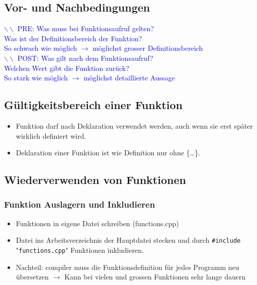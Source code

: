\documentclass[a3paper, 10pt, landscape]{scrartcl}
\newcommand{\code}[1]{\texttt{#1}}
\begin{document}
\begin{multicols*}{3}
	\subsection{Vor- und Nachbedingungen}
	\vspace{0.1cm}
	\textcolor{blue}{$\backslash \backslash$ PRE: Was muss bei Funktionsaufruf gelten? \\
	\phantom{// PRE: }Was ist der Definitionsbereich der Funktion? \\
	\phantom{// PRE: }So schwach wie möglich $\rightarrow$ möglichst grosser Definitionsbereich}\\
	\textcolor{blue}{$\backslash \backslash$ POST: Was gilt nach dem Funktionsaufruf? \\
	\phantom{// POST: }Welchen Wert gibt die Funktion zurück? \\
	\phantom{// POST: }So stark wie möglich $\rightarrow$ möglichst detaillierte Aussage} 	
	
	\subsection{Gültigkeitsbereich einer Funktion}
	\vspace{0.1cm}
	\begin{itemize}
		\item Funktion darf nach Deklaration verwendet werden, auch wenn sie erst später wirklich definiert wird.
		\item Deklaration einer Funktion ist wie Definition nur ohne \{\dots\}.
	\end{itemize}
	
	\subsection{Wiederverwenden von Funktionen}
	\subsubsection{Funktion Auslagern und Inkludieren}
	\vspace{0.1cm}
	\begin{itemize}
		\item Funktionen in eigene Datei schreiben (functions.cpp)
		\item Datei ins Arbeitsverzeichnis der Hauptdatei stecken und durch \code{\#include} "\code{functions.cpp}" \space Funktionen inkludieren.
		\item Nachteil: compiler muss die Funktionsdefinition für jedes Programm neu übersetzen
			$\rightarrow$ Kann bei vielen und grossen Funktionen sehr lange dauern
	\end{itemize}
	

\end{multicols*}
\end{document}
